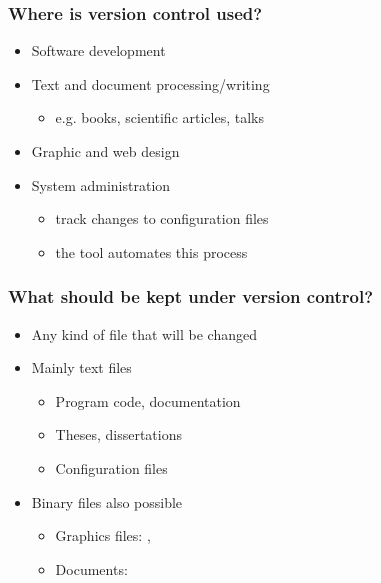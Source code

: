 \begin{frame}
\frametitle{Where is version control used?}
    \begin{itemize}
    \item Software development
    \item Text and document processing/writing
        \begin{itemize}
            \item e.g. books, scientific articles, talks
        \end{itemize}
    \item Graphic and web design
    \item System administration
        \begin{itemize}
            \item track changes to configuration files
            \item the tool  automates this process
        \end{itemize}
    \end{itemize}
\end{frame}

\begin{frame}
\frametitle{What should be kept under version control?}
\begin{itemize}
    \item Any kind of file that will be changed
    \item Mainly text files
        \begin{itemize}
        \item Program code, documentation
        \item Theses, dissertations
        \item Configuration files
        \end{itemize}
    \item Binary files also possible
        \begin{itemize}
        \item Graphics files: , 
        \item Documents: 
        \end{itemize}
\end{itemize}
\end{frame}

